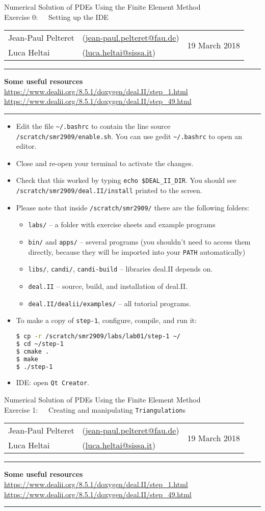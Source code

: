 \documentclass[11pt,answers]{exam}
\makeatletter
\newcommand{\makeheader}[3]{%
\setcounter{question}{0}
\begin{center}
{\sc Numerical Solution of PDEs Using the Finite Element Method}\vspace{2ex}\\
{\sc Exercise #1:\ \ \ #2}\vspace{2ex}\\
\begin{tabular*}{\textwidth}{ll @{\extracolsep{\fill}}r}
Jean-Paul Pelteret & (\url{jean-paul.pelteret@fau.de}) & \multirow{2}{*}{#3} \\
Luca Heltai & (\url{luca.heltai@sissa.it}) & \\
\end{tabular*}
\end{center}
}
\newcommand{\makeresources}[1]{%
\rule{\textwidth}{0.6mm}
\textbf{Some useful resources}\\[1.5ex]
#1 \\
\rule{\textwidth}{0.6mm}
}
\makeatother
\begin{document}

\clearpage
\makeheader{0}{Setting up the IDE}{19 March 2018}
\makeresources{%
\url{https://www.dealii.org/8.5.1/doxygen/deal.II/step_1.html} \\
\url{https://www.dealii.org/8.5.1/doxygen/deal.II/step_49.html}
}

\begin{itemize}
\item Edit the file \verb|~/.bashrc| to contain the line source \verb|/scratch/smr2909/enable.sh|. 
You can use gedit \verb|~/.bashrc| to open an editor. 
\item Close and re-open your terminal to activate the changes.
\item Check that this worked by typing \verb|echo $DEAL_II_DIR|. 
 You should see\\\verb|/scratch/smr2909/deal.II/install| printed to the screen.
\item Please note that inside \verb|/scratch/smr2909/| there are the following folders:
\begin{itemize}
\item \verb|labs/| -- a folder with exercise sheets and example programs
\item \verb|bin/| and \verb|apps/| -- several programs (you shouldn't need to access them directly, because they will be imported into your \verb|PATH| automatically)
\item \verb|libs/|, \verb|candi/|, \verb|candi-build| -- libraries deal.II depends on.
\item \verb|deal.II| -- source, build, and installation of deal.II.
\item \verb|deal.II/dealii/examples/| -- all tutorial programs.
\end{itemize}
\item To make a copy of \verb|step-1|, configure, compile, and run it:
\begin{lstlisting}[language=bash]
$ cp -r /scratch/smr2909/labs/lab01/step-1 ~/
$ cd ~/step-1
$ cmake .
$ make
$ ./step-1
\end{lstlisting}
\item  IDE: open \verb|Qt Creator|.
\end{itemize}




\clearpage
\makeheader{1}{Creating and manipulating \texttt{Triangulation}s}{19 March 2018}
\makeresources{%
\url{https://www.dealii.org/8.5.1/doxygen/deal.II/step_1.html} \\
\url{https://www.dealii.org/8.5.1/doxygen/deal.II/step_49.html}
}
\end{document}
